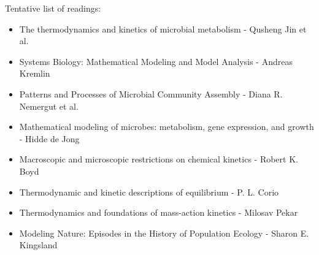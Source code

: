\documentclass[titlepage,11pt]{article}
\begin{document}
\begin{linenumbers}
\begin{center}
		\end{center}
		Tentative list of readings:
		\begin{itemize}
			\item The thermodynamics and kinetics of microbial metabolism - Qusheng Jin et al.
			\item Systems Biology: Mathematical Modeling and Model Analysis - Andreas Kremlin
			\item Patterns and Processes of Microbial Community Assembly - Diana R. Nemergut et al.
			\item Mathematical modeling of microbes: metabolism, gene expression, and growth - Hidde de Jong
			\item Macroscopic and microscopic restrictions on chemical kinetics - Robert K. Boyd
			\item Thermodynamic and kinetic descriptions of equilibrium - P. L. Corio
			\item Thermodynamics and foundations of mass-action kinetics - Milosav Pekar
			\item Modeling Nature: Episodes in the History of Population Ecology - Sharon E. Kingsland
		\end{itemize}
	\end{linenumbers}
	
	\newpage
	
\end{document}
